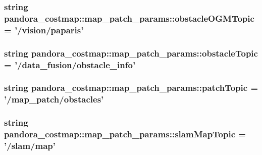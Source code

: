 \hypertarget{namespacepandora__costmap_1_1map__patch__params_ab43c9fda9d7a5a46d97b78d05eeda976}{
\subsubsection[{obstacle\-O\-G\-M\-Topic}]{\setlength{\rightskip}{0pt plus 5cm}string {\bf pandora\-\_\-costmap\-::map\-\_\-patch\-\_\-params\-::obstacle\-O\-G\-M\-Topic} = '/vision/paparis'}}\label{namespacepandora__costmap_1_1map__patch__params_ab43c9fda9d7a5a46d97b78d05eeda976}
\hypertarget{namespacepandora__costmap_1_1map__patch__params_a1d6c4fd52a7c27d192c98dc891a31350}{
\subsubsection[{obstacle\-Topic}]{\setlength{\rightskip}{0pt plus 5cm}string {\bf pandora\-\_\-costmap\-::map\-\_\-patch\-\_\-params\-::obstacle\-Topic} = '/data\-\_\-fusion/obstacle\-\_\-info'}}\label{namespacepandora__costmap_1_1map__patch__params_a1d6c4fd52a7c27d192c98dc891a31350}
\hypertarget{namespacepandora__costmap_1_1map__patch__params_aa5ad658af1965f024f6b4179697870cf}{
\subsubsection[{patch\-Topic}]{\setlength{\rightskip}{0pt plus 5cm}string {\bf pandora\-\_\-costmap\-::map\-\_\-patch\-\_\-params\-::patch\-Topic} = '/map\-\_\-patch/obstacles'}}\label{namespacepandora__costmap_1_1map__patch__params_aa5ad658af1965f024f6b4179697870cf}
\hypertarget{namespacepandora__costmap_1_1map__patch__params_aa01557cea0c3898c25909131d7725989}{
\subsubsection[{slam\-Map\-Topic}]{\setlength{\rightskip}{0pt plus 5cm}string {\bf pandora\-\_\-costmap\-::map\-\_\-patch\-\_\-params\-::slam\-Map\-Topic} = '/slam/map'}}\label{namespacepandora__costmap_1_1map__patch__params_aa01557cea0c3898c25909131d7725989}
